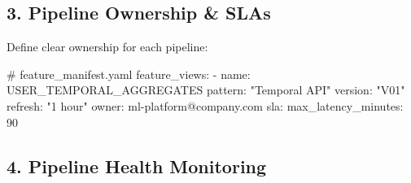 \documentclass[
  letterpaper,
  DIV=11,
  numbers=noendperiod]{scrreprt}
\newenvironment{Shaded}{\begin{snugshade}}{\end{snugshade}}
\newcommand{\AttributeTok}[1]{\textcolor[rgb]{0.40,0.45,0.13}{#1}}
\newcommand{\CommentTok}[1]{\textcolor[rgb]{0.37,0.37,0.37}{#1}}
\newcommand{\ControlFlowTok}[1]{\textcolor[rgb]{0.00,0.23,0.31}{#1}}
\newcommand{\DecValTok}[1]{\textcolor[rgb]{0.68,0.00,0.00}{#1}}
\newcommand{\FunctionTok}[1]{\textcolor[rgb]{0.28,0.35,0.67}{#1}}
\newcommand{\KeywordTok}[1]{\textcolor[rgb]{0.00,0.23,0.31}{#1}}
\newcommand{\NormalTok}[1]{\textcolor[rgb]{0.00,0.23,0.31}{#1}}
\newcommand{\OperatorTok}[1]{\textcolor[rgb]{0.37,0.37,0.37}{#1}}
\newcommand{\StringTok}[1]{\textcolor[rgb]{0.13,0.47,0.30}{#1}}
\begin{document}
\hypertarget{pipeline-ownership-slas}{%
\subsection{3. Pipeline Ownership \&
SLAs}\label{pipeline-ownership-slas}}

Define clear ownership for each pipeline:

\begin{Shaded}
\begin{Highlighting}[]
\CommentTok{\# feature\_manifest.yaml}
\FunctionTok{feature\_views}\KeywordTok{:}
\AttributeTok{  }\KeywordTok{{-}}\AttributeTok{ }\FunctionTok{name}\KeywordTok{:}\AttributeTok{ USER\_TEMPORAL\_AGGREGATES}
\AttributeTok{    }\FunctionTok{pattern}\KeywordTok{:}\AttributeTok{ }\StringTok{"Temporal API"}
\AttributeTok{    }\FunctionTok{version}\KeywordTok{:}\AttributeTok{ }\StringTok{"V01"}
\AttributeTok{    }\FunctionTok{refresh}\KeywordTok{:}\AttributeTok{ }\StringTok{"1 hour"}
\AttributeTok{    }\FunctionTok{owner}\KeywordTok{:}\AttributeTok{ ml{-}platform@company.com}
\AttributeTok{    }\FunctionTok{sla}\KeywordTok{:}
\AttributeTok{      }\FunctionTok{max\_latency\_minutes}\KeywordTok{:}\AttributeTok{ }\DecValTok{90}
\end{Highlighting}
\end{Shaded}

\hypertarget{pipeline-health-monitoring}{%
\subsection{4. Pipeline Health
Monitoring}\label{pipeline-health-monitoring}}

\begin{Shaded}
\end{Shaded}
\end{document}
